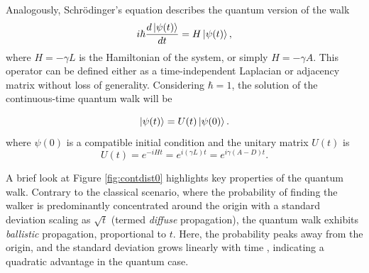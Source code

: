 \documentclass[main.tex]{subfiles}
\begin{document}
Analogously, Schrödinger's equation describes the quantum version of the walk 
\begin{equation}
	i\hbar \frac{d\ket{\psi(t)}}{dt} = H \ket{\psi(t)}, \label{shrodinger}
\end{equation}
where $H = -\gamma L$ is the Hamiltonian of the system, or simply $H = -\gamma
A$. This operator can be defined either as a time-independent Laplacian or
adjacency matrix without loss of generality. Considering $\hbar = 1$, the
solution of the continuous-time quantum walk will be 

\begin{equation}
	\ket{\psi(t)} = U(t)\ket{\psi(0)}.
    \label{eq:ctqwSystemEvolution}
\end{equation}
where $\psi(0)$ is a compatible initial condition and the unitary matrix $U(t)$
is
\begin{equation}
	U(t) = e^{-iHt} = e^{i(\gamma L)t} = e^{i\gamma(A-D)t}.
    \label{eq:contSimulUniOp}
\end{equation}

A brief look at Figure \ref{fig:contdist0} highlights key properties of the
quantum walk. Contrary to the classical scenario, where the probability of
finding the walker is predominantly concentrated around the origin with a
standard deviation scaling as $\sqrt{t}$ (termed \textit{diffuse} propagation),
the quantum walk exhibits \textit{ballistic} propagation, proportional to $t$. Here, the probability
peaks away from the origin, and the standard deviation grows linearly with time
\cite{childs2002}, indicating a quadratic advantage in the quantum case.

\end{document}
